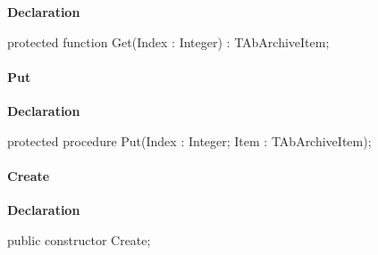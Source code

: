 \documentclass{report}
\newif\ifpdf
\begin{document}
\label{AbArcTyp.TAbArchiveList-Get}
\begin{list}{}{
\setlength{\itemindent}{0cm}
\setlength{\listparindent}{0cm}
\setlength{\leftmargin}{\evensidemargin}
\addtolength{\leftmargin}{\tmplength}
\settowidth{\labelsep}{X}
\addtolength{\leftmargin}{\labelsep}
\setlength{\labelwidth}{\tmplength}
}
\item[\textbf{Declaration}\hfill]
\ifpdf
\begin{flushleft}
\fi
\begin{ttfamily}
protected function Get(Index : Integer) : TAbArchiveItem;\end{ttfamily}

\ifpdf
\end{flushleft}
\fi

\end{list}
\paragraph*{Put}\hspace*{\fill}

\label{AbArcTyp.TAbArchiveList-Put}
\begin{list}{}{
\setlength{\itemindent}{0cm}
\setlength{\listparindent}{0cm}
\setlength{\leftmargin}{\evensidemargin}
\addtolength{\leftmargin}{\tmplength}
\settowidth{\labelsep}{X}
\addtolength{\leftmargin}{\labelsep}
\setlength{\labelwidth}{\tmplength}
}
\item[\textbf{Declaration}\hfill]
\ifpdf
\begin{flushleft}
\fi
\begin{ttfamily}
protected procedure Put(Index : Integer; Item : TAbArchiveItem);\end{ttfamily}

\ifpdf
\end{flushleft}
\fi

\end{list}
\paragraph*{Create}\hspace*{\fill}

\label{AbArcTyp.TAbArchiveList-Create}
\begin{list}{}{
\setlength{\itemindent}{0cm}
\setlength{\listparindent}{0cm}
\setlength{\leftmargin}{\evensidemargin}
\addtolength{\leftmargin}{\tmplength}
\settowidth{\labelsep}{X}
\addtolength{\leftmargin}{\labelsep}
\setlength{\labelwidth}{\tmplength}
}
\item[\textbf{Declaration}\hfill]
\ifpdf
\begin{flushleft}
\fi
\begin{ttfamily}
public constructor Create;\end{ttfamily}

\ifpdf
\end{flushleft}
\fi

\end{list}
\end{document}
